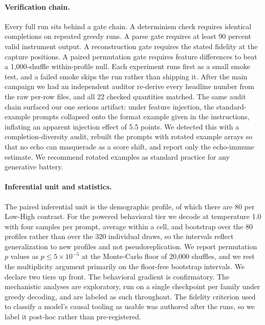\documentclass[11pt]{article}
\begin{document}
\paragraph{Verification chain.} Every full run sits behind a gate chain. A determinism check requires identical completions on repeated greedy runs. A parse gate requires at least 90 percent valid instrument output. A reconstruction gate requires the stated fidelity at the capture positions. A paired permutation gate requires feature differences to beat a 1,000-shuffle within-profile null. Each experiment runs first as a small smoke test, and a failed smoke skips the run rather than shipping it. After the main campaign we had an independent auditor re-derive every headline number from the raw per-row files, and all 22 checked quantities matched. The same audit chain surfaced our one serious artifact: under feature injection, the standard-example prompts collapsed onto the format example given in the instructions, inflating an apparent injection effect of 5.5 points. We detected this with a completion-diversity audit, rebuilt the prompts with rotated example arrays so that no echo can masquerade as a score shift, and report only the echo-immune estimate. We recommend rotated examples as standard practice for any generative battery.

\paragraph{Inferential unit and statistics.} The paired inferential unit is the demographic profile, of which there are 80 per Low-High contrast. For the powered behavioral tier we decode at temperature 1.0 with four samples per prompt, average within a cell, and bootstrap over the 80 profiles rather than over the 320 individual draws, so the intervals reflect generalization to new profiles and not pseudoreplication. We report permutation $p$ values as $p \le 5\times10^{-5}$ at the Monte-Carlo floor of 20{,}000 shuffles, and we rest the multiplicity argument primarily on the floor-free bootstrap intervals. We declare two tiers up front. The behavioral gradient is confirmatory. The mechanistic analyses are exploratory, run on a single checkpoint per family under greedy decoding, and are labeled as such throughout. The fidelity criterion used to classify a model's causal tooling as usable was authored after the runs, so we label it post-hoc rather than pre-registered.
\end{document}
